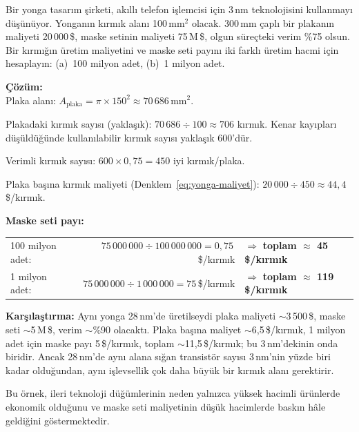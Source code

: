 \begin{ornek}[1.2]
Bir yonga tasarım şirketi, akıllı telefon işlemcisi için 3\,nm teknolojisini kullanmayı düşünüyor. Yonganın kırmık alanı 100\,mm$^2$ olacak. 300\,mm çaplı bir plakanın maliyeti 20\,000\,\$, maske setinin maliyeti 75\,M\,\$, olgun süreçteki verim \%75 olsun. Bir kırmığın üretim maliyetini ve maske seti payını iki farklı üretim hacmi için hesaplayın: (a)~100 milyon adet, (b)~1 milyon adet.

\textbf{Çözüm:}\\
Plaka alanı: $A_\text{plaka} = \pi \times 150^2 \approx 70\,686$\,mm$^2$.

Plakadaki kırmık sayısı (yaklaşık): $70\,686 \div 100 \approx 706$ kırmık. Kenar kayıpları düşüldüğünde kullanılabilir kırmık sayısı yaklaşık 600'dür.

Verimli kırmık sayısı: $600 \times 0{,}75 = 450$ iyi kırmık/plaka.

Plaka başına kırmık maliyeti (Denklem~\ref{eq:yonga-maliyet}): $20\,000 \div 450 \approx 44{,}4$\,\$/kırmık.

\medskip
\textbf{Maske seti payı:}

\smallskip
\begin{tabular}{@{}lrl@{}}
100 milyon adet: & $75\,000\,000 \div 100\,000\,000 = 0{,}75$\,\$/kırmık & $\Rightarrow$ \textbf{toplam $\approx$ 45\,\$/kırmık} \\[4pt]
1 milyon adet:   & $75\,000\,000 \div 1\,000\,000 = 75$\,\$/kırmık     & $\Rightarrow$ \textbf{toplam $\approx$ 119\,\$/kırmık}
\end{tabular}

\medskip
\textbf{Karşılaştırma:} Aynı yonga 28\,nm'de üretilseydi plaka maliyeti ${\sim}$3\,500\,\$, maske seti ${\sim}$5\,M\,\$, verim ${\sim}$\%90 olacaktı. Plaka başına maliyet ${\sim}$6{,}5\,\$/kırmık, 1 milyon adet için maske payı 5\,\$/kırmık, toplam ${\sim}$11{,}5\,\$/kırmık; bu 3\,nm'dekinin onda biridir. Ancak 28\,nm'de aynı alana sığan transistör sayısı 3\,nm'nin yüzde biri kadar olduğundan, aynı işlevsellik çok daha büyük bir kırmık alanı gerektirir.

Bu örnek, ileri teknoloji düğümlerinin neden yalnızca yüksek hacimli ürünlerde ekonomik olduğunu ve maske seti maliyetinin düşük hacimlerde baskın hâle geldiğini göstermektedir.
\end{ornek}

